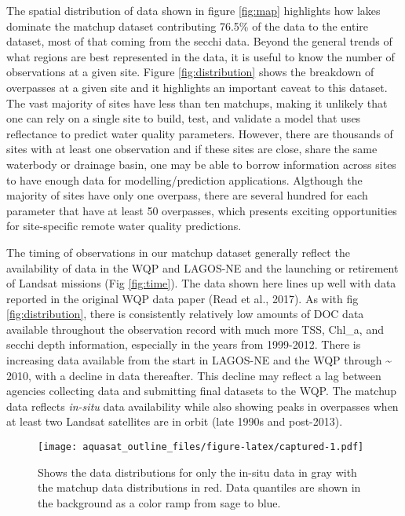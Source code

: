 \documentclass[]{article}
\begin{document}
The spatial distribution of data shown in figure \ref{fig:map}
highlights how lakes dominate the matchup dataset contributing 76.5\% of
the data to the entire dataset, most of that coming from the secchi
data. Beyond the general trends of what regions are best represented in
the data, it is useful to know the number of observations at a given
site. Figure \ref{fig:distribution} shows the breakdown of overpasses at
a given site and it highlights an important caveat to this dataset. The
vast majority of sites have less than ten matchups, making it unlikely
that one can rely on a single site to build, test, and validate a model
that uses reflectance to predict water quality parameters. However,
there are thousands of sites with at least one observation and if these
sites are close, share the same waterbody or drainage basin, one may be
able to borrow information across sites to have enough data for
modelling/prediction applications. Algthough the majority of sites have
only one overpass, there are several hundred for each parameter that
have at least 50 overpasses, which presents exciting opportunities for
site-specific remote water quality predictions.

The timing of observations in our matchup dataset generally reflect the
availability of data in the WQP and LAGOS-NE and the launching or
retirement of Landsat missions (Fig \ref{fig:time}). The data shown here
lines up well with data reported in the original WQP data paper (Read et
al., 2017). As with fig \ref{fig:distribution}, there is consistently
relatively low amounts of DOC data available throughout the observation
record with much more TSS, Chl\_a, and secchi depth information,
especially in the years from 1999-2012. There is increasing data
available from the start in LAGOS-NE and the WQP through
\textasciitilde{} 2010, with a decline in data thereafter. This decline
may reflect a lag between agencies collecting data and submitting final
datasets to the WQP. The matchup data reflects \emph{in-situ} data
availability while also showing peaks in overpasses when at least two
Landsat satellites are in orbit (late 1990s and post-2013).

\begin{figure}
\centering
\texttt{[image: aquasat\_outline\_files/figure-latex/captured-1.pdf]}
\caption{\label{fig:captured} Shows the data distributions for only the
in-situ data in gray with the matchup data distributions in red. Data
quantiles are shown in the background as a color ramp from sage to
blue.}
\end{figure}
\end{document}
